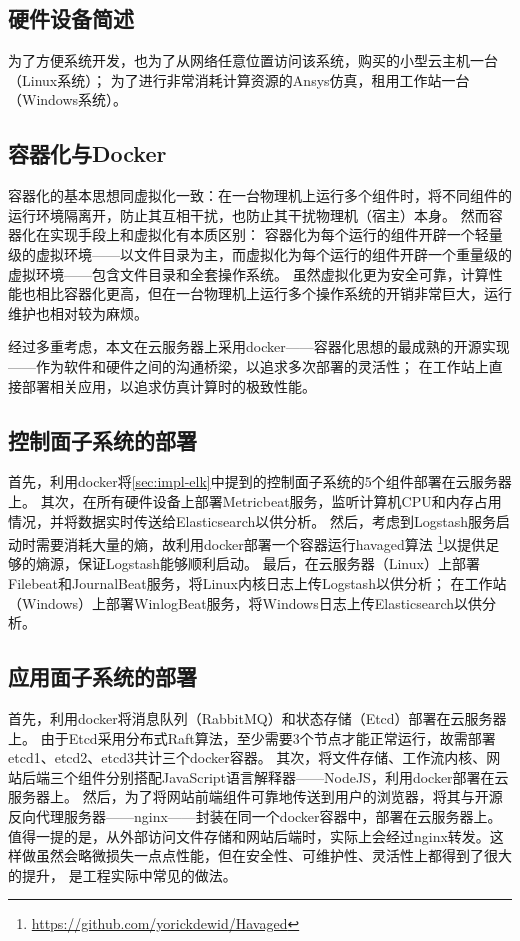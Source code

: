 \documentclass[index]{subfiles}
\begin{document}
\subsection{硬件设备简述}
为了方便系统开发，也为了从网络任意位置访问该系统，购买的小型云主机一台（Linux系统）；
为了进行非常消耗计算资源的Ansys仿真，租用工作站一台（Windows系统）。

\subsection{容器化与Docker}
容器化的基本思想同虚拟化一致：在一台物理机上运行多个组件时，将不同组件的运行环境隔离开，防止其互相干扰，也防止其干扰物理机（宿主）本身。
然而容器化在实现手段上和虚拟化有本质区别：
容器化为每个运行的组件开辟一个轻量级的虚拟环境——以文件目录为主，而虚拟化为每个运行的组件开辟一个重量级的虚拟环境——包含文件目录和全套操作系统。
虽然虚拟化更为安全可靠，计算性能也相比容器化更高，但在一台物理机上运行多个操作系统的开销非常巨大，运行维护也相对较为麻烦\cite{docker}。

经过多重考虑，本文在云服务器上采用docker——容器化思想的最成熟的开源实现——作为软件和硬件之间的沟通桥梁，以追求多次部署的灵活性；
在工作站上直接部署相关应用，以追求仿真计算时的极致性能。

\subsection{控制面子系统的部署}
首先，利用docker将\cref{sec:impl-elk}中提到的控制面子系统的5个组件部署在云服务器上。
其次，在所有硬件设备上部署Metricbeat服务，监听计算机CPU和内存占用情况，并将数据实时传送给Elasticsearch以供分析。
然后，考虑到Logstash服务启动时需要消耗大量的熵，故利用docker部署一个容器运行havaged算法
\footnote{\href{https://github.com/yorickdewid/Havaged}{https://github.com/yorickdewid/Havaged}}以提供足够的熵源，保证Logstash能够顺利启动。
最后，在云服务器（Linux）上部署Filebeat和JournalBeat服务，将Linux内核日志上传Logstash以供分析；
在工作站（Windows）上部署WinlogBeat服务，将Windows日志上传Elasticsearch以供分析。

\subsection{应用面子系统的部署}
首先，利用docker将消息队列（RabbitMQ）和状态存储（Etcd）部署在云服务器上。
由于Etcd采用分布式Raft算法，至少需要3个节点才能正常运行，故需部署etcd1、etcd2、etcd3共计三个docker容器。
其次，将文件存储、工作流内核、网站后端三个组件分别搭配JavaScript语言解释器——NodeJS，利用docker部署在云服务器上。
然后，为了将网站前端组件可靠地传送到用户的浏览器，将其与开源反向代理服务器——nginx——封装在同一个docker容器中，部署在云服务器上。
值得一提的是，从外部访问文件存储和网站后端时，实际上会经过nginx转发。这样做虽然会略微损失一点点性能，但在安全性、可维护性、灵活性上都得到了很大的提升，
是工程实际中常见的做法。
\end{document}

